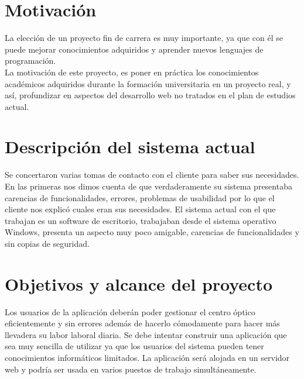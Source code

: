 

\section{Motivación}
La elección de un proyecto fin de carrera es muy importante, ya que con él se puede mejorar conocimientos adquiridos y aprender
nuevos lenguajes de programación.\\
La motivación de este proyecto, es poner en práctica los conocimientos académicos adquiridos durante la formación universitaria en un proyecto real, y así, profundizar en aspectos del desarrollo web no tratados en el plan de estudios actual.


\section{Descripción del sistema actual}
Se concertaron varias tomas de contacto con el cliente para saber sus necesidades. En las primeras nos dimos cuenta de que 
verdaderamente su sistema presentaba carencias de funcionalidades, errores, problemas de usabilidad por lo que el cliente nos explicó cuales eran sus necesidades.
El sistema actual con el que trabajan es un software de escritorio, trabajaban desde el sistema operativo Windows, 
presenta un aspecto muy poco amigable, carencias de funcionalidades y sin copias de seguridad.

\section{Objetivos y alcance del proyecto}
Los usuarios de la aplicación deberán poder gestionar el centro óptico eficientemente y sin errores además de hacerlo cómodamente para hacer más llevadera su labor laboral diaria. Se debe intentar construir una aplicación que sea muy sencilla de utilizar ya que los usuarios del sistema
pueden tener conocimientos informáticos limitados. La aplicación será alojada en un servidor web y podría ser usada en varios puestos de trabajo simultáneamente.

